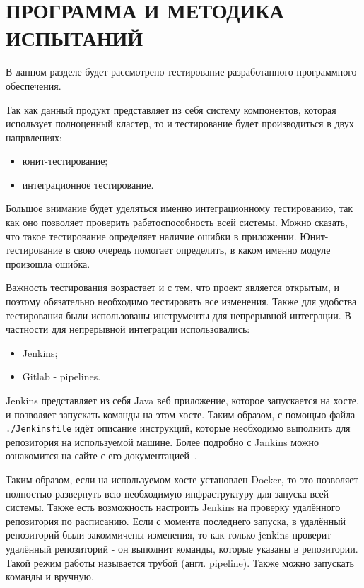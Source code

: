 \pagebreak
\section{ПРОГРАММА И МЕТОДИКА ИСПЫТАНИЙ}
\label{sec:testing}

В данном разделе будет рассмотрено тестирование разработанного программного обеспечения.

Так как данный продукт представляет из себя систему компонентов, которая использует полноценный кластер, то и тестирование будет производиться в двух напрвлениях:
\begin{itemize}
    \item юнит-тестирование;
    \item интеграционное тестирование.
\end{itemize}

Большое внимание будет уделяться именно интеграционному тестированию, так как оно позволяет проверить рабатоспособность всей системы.
Можно сказать, что такое тестирование определяет наличие ошибки в приложении.
Юнит-тестирование в свою очередь помогает определить, в каком именно модуле произошла ошибка.

Важность тестирования возрастает и с тем, что проект является открытым, и поэтому обязательно необходимо тестировать все изменения.
Также для удобства тестирования были использованы инструменты для непрерывной интеграции.
В частности для непрерывной интеграции использовались:
\begin{itemize}
    \item Jenkins;
    \item Gitlab - pipelines.
\end{itemize}


Jenkins представляет из себя Java веб приложение, которое запускается на хосте, и позволяет запускать команды на этом хосте.
Таким образом, с помощью файла \texttt{./Jenkinsfile} идёт описание инструкций, которые необходимо выполнить для репозитория на используемой машине.
Более подробно с Jankins можно ознакомится на сайте с его документацией~\cite{jenkins_documentation}.

Таким образом, если на используемом хосте установлен Docker, то это позволяет полностью развернуть всю необходимую инфраструктуру для запуска всей системы.
Также есть возможность настроить Jenkins на проверку удалённого репозитория по расписанию.
Если с момента последнего запуска, в удалённый репозиторий были закоммичены изменения, то как только jenkins проверит удалённый репозиторий - он выполнит команды, которые указаны в репозитории.
Такой режим работы называется трубой (англ. pipeline).
Также можно запускать команды и вручную.

